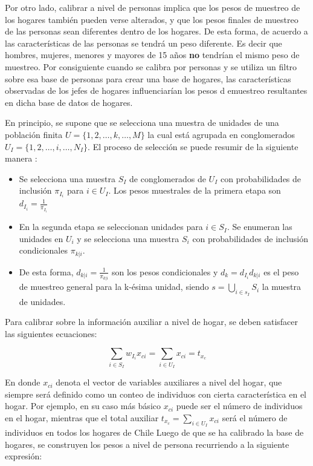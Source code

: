 Por otro lado, calibrar a nivel de personas implica que los pesos de muestreo de los hogares también pueden verse alterados, y que los pesos finales de muestreo de las personas sean diferentes dentro de los hogares. De esta forma, de acuerdo a las características de las personas se tendrá un peso diferente. Es decir que hombres, mujeres, menores y mayores de 15 años \textbf{no} tendrían el mismo peso de muestreo. Por consiguiente cuando se calibra por personas y se utiliza un filtro sobre esa base de personas para crear una base de hogares, las características observadas de los jefes de hogares influenciarían los pesos d emuestreo resultantes en dicha base de datos de hogares.

En principio, se supone que se selecciona una muestra de unidades de una población finita \(U = \lbrace 1,2,\ldots,k,\ldots,M\rbrace\) la cual está agrupada en conglomerados \(U_I = \lbrace 1, 2,\ldots, i, \ldots, N_I \rbrace\). El proceso de selección se puede resumir de la siguiente manera \citep{Gutierrez_2016}:

\begin{itemize}
\tightlist
\item
  Se selecciona una muestra \(S_I\) de conglomerados de \(U_I\) con probabilidades de inclusión \(\pi_{I_i}\) para \(i\in U_I\). Los pesos muestrales de la primera etapa son \(d_{I_i} = \frac{1}{\pi_{I_i}}\)
\item
  En la segunda etapa se seleccionan unidades para \(i\in S_I\). Se enumeran las unidades en \(U_i\) y se selecciona una muestra \(S_i\) con probabilidades de inclusión condicionales \(\pi_{k|i}\).
\item
  De esta forma, \(d_{k|i} = \frac{1}{\pi_{k|i}}\) son los pesos condicionales y \(d_k = d_{I_i}d_{k|i}\) es el peso de muestreo general para la k-ésima unidad, siendo \(s =\bigcup_{i\in s_I}S_i\) la muestra de unidades.
\end{itemize}

Para calibrar sobre la información auxiliar a nivel de hogar, se deben satisfacer las siguientes ecuaciones:

\[
\sum_{i \in S_I}w_{I_i}x_{ci} = \sum_{i \in U_I}x_{ci} = t_{x_c}
\]

En donde \(x_{ci}\) denota el vector de variables auxiliares a nivel del hogar, que siempre será definido como un conteo de individuos con cierta característica en el hogar. Por ejemplo, en su caso más básico \(x_{ci}\) puede ser el número de individuos en el hogar, mientras que el total auxiliar \(t_{x_c} = \sum_{i \in U_I}x_{ci}\) será el número de individuos en todos los hogares de Chile Luego de que se ha calibrado la base de hogares, se construyen los pesos a nivel de persona recurriendo a la siguiente expresión:

